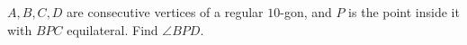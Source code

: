 $A,B,C,D$ are consecutive vertices of a regular $10$-gon, and $P$ is the point inside it with $BPC$ equilateral. Find $\angle BPD$.
